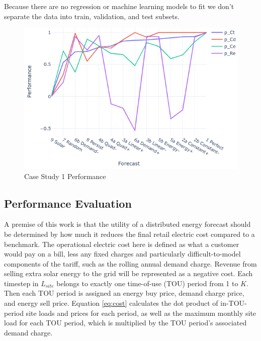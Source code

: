 \documentclass[conference]{IEEEtran}
\begin{document}
Because there are no regression or machine learning models to fit we don't separate the data into train, validation, and test subsets.

\begin{figure}
    \centering
    \includegraphics[width=1\linewidth]{images/perf_lines.png}
    \caption{Case Study 1 Performance}
    \label{fig:cs1-performance}
\end{figure}

\subsection{Performance Evaluation}

A premise of this work is that the utility of a distributed energy forecast should be determined by how much it reduces the final retail electric cost compared to a benchmark. The operational electric cost here is defined as what a customer would pay on a bill, less any fixed charges and particularly difficult-to-model components of the tariff, such as the rolling annual demand charge. Revenue from selling extra solar energy to the grid will be represented as a negative cost. Each timestep in $L_{site}$ belongs to exactly one time-of-use (TOU) period from 1 to $K$. Then each TOU period is assigned an energy buy price, demand charge price, and energy sell price. Equation \ref{eq:cost} calculates the dot product of in-TOU-period site loads and prices for each period, as well as the maximum monthly site load for each TOU period, which is multiplied by the TOU period's associated demand charge.
\end{document}
